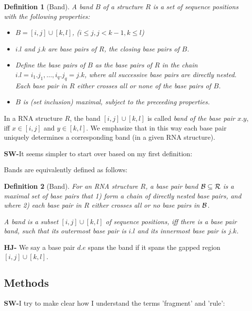 \documentclass[11pt]{article} %
\newtheorem{definition}{Definition}
\newcommand{\SW}[1]{\textbf{SW-}#1}
\begin{document}
\begin{definition}[Band]
A \emph{band} $B$ of a structure $R$ is a set of sequence positions with the following properties:
\begin{itemize}
\item $B=[i,j]\cup[k,l]$, ($i\leq j, j<k-1, k\leq l$)
\item $i.l$ and $j.k$ are base pairs of $R$, the \emph{closing base pairs of $B$}.
\item Define the \emph{base pairs of $B$} as the base pairs of $R$
in the chain $i.l=i_1.j_1, \dots, i_q.j_q=j.k$, where all successive base pairs are directly nested.
 Each base pair in $R$ either crosses all or none of the base pairs of $B$. 
\item $B$ is (set inclusion) maximal, subject to the preceeding properties.
\end{itemize}
\end{definition}

In a RNA structure $R$, the band $[i,j]\cup[k,l]$ is called \emph{band of the base pair $x.y$}, iff $x\in[i,j]$ and $y\in[k,l]$. We emphasize that in this way each base pair uniquely determines a corresponding band (in a given RNA structure).

\SW{It seems simpler to start over based on my first definition:}

Bands are equivalently defined as follows:

\begin{definition}[Band]
For an RNA structure $R$, a \emph{base pair band $\cal B\subseteq R$} is a maximal set of base pairs that 1) form a chain of directly nested base pairs, and where 2) each base pair in $R$ either crosses all or no base pairs in $\cal B$.

A \emph{band} is a subset $[i,j]\cup[k,l]$ of sequence positions, iff there is a base pair band, such that its outermost base pair is $i.l$ and its innermost base pair is $j.k$.
\end{definition}
\textbf{HJ-} We say a base pair $d.e$ spans the band if it spans the gapped region $[i,j]\cup[k,l]$.



\subsection{Methods}

\SW{I try to make clear how I understand the terms 'fragment' and 'rule':}
\end{document}
